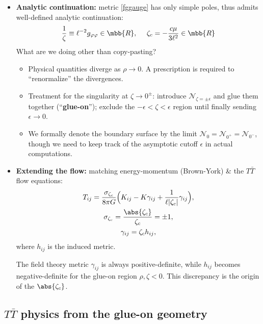 \documentclass[10pt]{article}
\newcommand{\TTbar}{\texorpdfstring{\ensuremath{T\bar{T}}}{TTbar}\xspace}
\begin{document}
\begin{multicols}{3}
\begin{itemize}
\item \textbf{Analytic continuation:} metric \eqref{fggauge} has only simple poles, thus admits well-defined analytic continuation:
\begin{equation}
	\frac{1}{\zeta} \equiv \ell^{-2} g_{\varphi\varphi} \in \mbb{R},
\ \quad
	\zeta_c = - \frac{c \mu}{3\ell^2} \in \mbb{R}
\end{equation}
What are we doing other than copy-pasting?
	\begin{itemize}
	\item Physical quantities diverge as $\rho \to 0$.
	A prescription is required to ``renormalize'' the divergences.
	
	\item Treatment for the singularity at $\zeta\to 0^\pm$: introduce $\mathcal N_{\zeta={\pm\epsilon}}$ and glue them together (``\textbf{glue-on}'');
		exclude the $-\epsilon < \zeta < \epsilon$ region until finally sending $\epsilon \to 0$. 
	\item We formally denote the boundary surface by the limit $\mathcal N_{0}=\mathcal N_{0^+}=\mathcal N_{0^-}$, though we need to keep track of the asymptotic cutoff $\epsilon$ in actual computations.
	\end{itemize}
	
\item \textbf{Extending the flow:} matching energy-momentum (Brown-York) \& the \TTbar flow equations:
	\begin{equation}
	\begin{gathered}
		T_{ij}= \frac{\sigma_{\zeta_c}}{8\pi G} \Big( K_{ij} -  K \gamma_{ij} + \frac{1}{\ell |\zeta_c|}\gamma_{ij}\Big), \\ \sigma_{\zeta_c} = \frac{\abs{\zeta_c}}{\zeta_c} = \pm 1,\\
		\gamma_{ij} = \zeta_c h_{ij},
	\end{gathered}	\label{BYtensor}
	\end{equation}
	where $h_{ij}$ is the induced metric. 
	
	The field theory metric $\gamma_{ij}$ is always positive-definite, while $h_{ij}$ becomes negative-definite for the glue-on region $\rho,\zeta < 0$.
	This discrepancy is the origin of the $\abs{\zeta_c}$.

\end{itemize}

\subsection*{\TTbar physics from the glue-on geometry}


\end{multicols}
\end{document}
